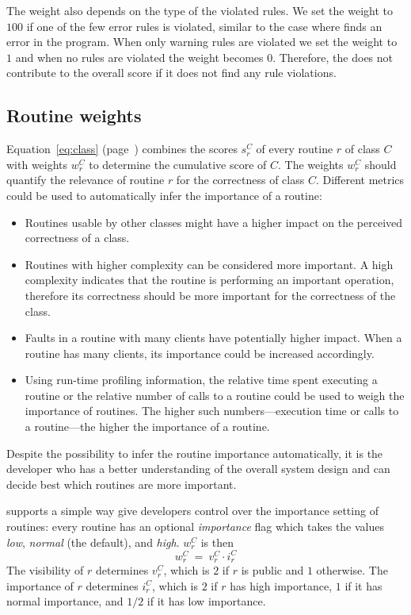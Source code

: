 The weight also depends on the type of the violated rules.
We set the weight to $100$ if one of the few error rules is violated, similar to the case where \AutoTest finds an error in the program.
When only warning rules are violated we set the weight to $1$ and when no rules are violated the weight becomes $0$.
Therefore, the \Inspector does not contribute to the overall score if it does not find any rule violations.

\subsection{Routine weights}

Equation~\ref{eq:class} (page~\pageref{eq:class}) combines the scores $s_r^C$ of every routine $r$ of class $C$ with weights $w_r^C$ to determine the cumulative score of $C$.
The weights $w_r^C$ should quantify the relevance of routine $r$ for the correctness of class $C$.
Different metrics could be used to automatically infer the importance of a routine:
\begin{itemize}
\item
Routines usable by other classes might have a higher impact on the perceived correctness of a class.

\item
Routines with higher complexity can be considered more important. A high complexity indicates that the routine is performing an important operation, therefore its correctness should be more important for the correctness of the class.

\item
Faults in a routine with many clients have potentially higher impact. When a routine has many clients, its importance could be increased accordingly.

\item
Using run-time profiling information, the relative time spent executing a routine or the relative number of calls to a routine could be used to weigh the importance of routines. The higher such numbers---execution time or calls to a routine---the higher the importance of a routine.

\end{itemize}

Despite the possibility to infer the routine importance automatically, it is the developer who has a better understanding of the overall system design and can decide best which routines are more important.

\EVE supports a simple way give developers control over the importance setting of routines: every routine has an optional \emph{importance} flag which takes the values \emph{low}, \emph{normal} (the default), and \emph{high}.
$w_r^C$ is then $$w_r^C \ =\ v_r^C \cdot i_r^C$$
The visibility of $r$ determines $v_r^C$, which is $2$ if $r$ is public and $1$ otherwise.
The importance of $r$ determines $i_r^C$, which is $2$ if $r$ has high importance, $1$ if it has normal importance, and $1/2$ if it has low importance.


